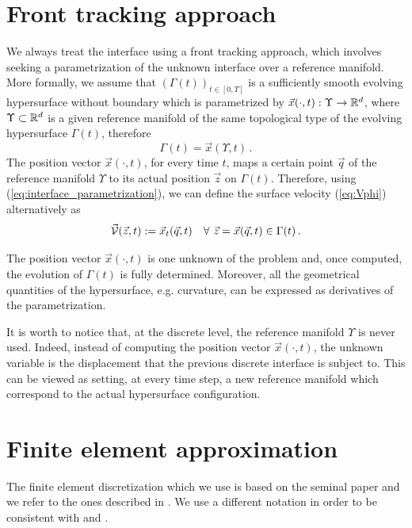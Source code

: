\section{Front tracking approach}\label{sec:front_tracking_approach}
We always treat the interface using a front tracking approach, which involves
seeking a parametrization of the unknown interface over a reference manifold.
More formally, we assume that $(\Gamma(t))_{t\in [0,T]}$ is a sufficiently
smooth evolving hypersurface without boundary which is parametrized by
$\vec x(\cdot,t):\Upsilon\to\mathbb R^d$, where $\Upsilon\subset \mathbb R^d$ is a given
reference manifold of the same topological type of the evolving hypersurface
$\Gamma(t)$, therefore
\begin{equation}\label{eq:interface_parametrization}
\Gamma(t) = \vec x(\Upsilon,t)\,.
\end{equation}
The position vector $\vec x(\cdot,t)$, for every time $t$, maps a certain point
$\vec q$ of the reference manifold $\Upsilon$ to its actual position
$\vec z$ on $\Gamma(t)$. Therefore, using (\ref{eq:interface_parametrization}),
we can define the surface velocity (\ref{eq:Vphi}) alternatively as
\begin{equation} \label{eq:V}
\vec{\mathcal{V}}(\vec z, t) := \vec x_t(\vec q, t) \quad
\forall\ \vec z = \vec x(\vec q,t) \in \Gamma(t)\,.
\end{equation}

The position vector $\vec x(\cdot,t)$ is one unknown of the problem and, once
computed, the evolution of $\Gamma(t)$ is fully determined. Moreover, all the
geometrical quantities of the hypersurface, e.g. curvature, can be expressed as
derivatives of the parametrization.

It is worth to notice that, at the discrete level, the reference manifold
$\Upsilon$ is never used. Indeed, instead of computing the position vector
$\vec x(\cdot,t)$, the unknown variable is the displacement that the previous
discrete interface is subject to. This can be viewed as setting, at every time
step, a new reference manifold which correspond to the actual hypersurface
configuration.

\section{Finite element approximation}\label{sec:geometric_pdes_fem}
The finite element discretization which we use is based on the seminal paper
\cite{Dziuk91} and we refer to the ones described in
\cite{triplejMC,triplej,gflows3d}. We use a different notation in order to be
consistent with \cite{spurious} and \cite{stokesfitted}.

